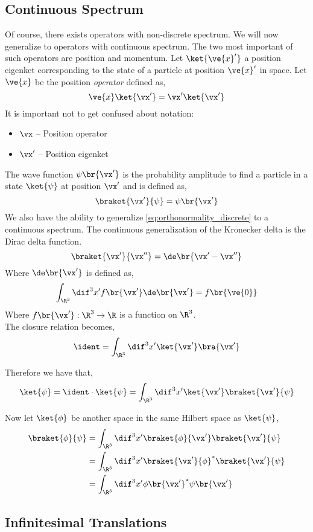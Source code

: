 \documentclass{article}
\begin{document}
\subsection{Continuous Spectrum}
Of course, there exists operators with non-discrete spectrum. We will now generalize to operators with continuous spectrum. The two most important of such operators are position and momentum. Let $\ket{\ve{x}'}$ a position eigenket corresponding to the state of a particle at position $\ve{x}'$ in space. Let $\ve{x}$ be the position \textit{operator} defined as,
\[ \ve{x} \ket{\vx'} = \vx' \ket{\vx'} \]
It is important not to get confused about notation:
\begin{itemize}
    \item $\vx$ -- Position operator
    \item $\vx'$ -- Position eigenket
\end{itemize}
The wave function $\psi\br{\vx'}$ is the probability amplitude to find a particle in a state $\ket{\psi}$ at position $\vx'$ and is defined as,
\[ \braket{\vx'}{\psi} = \psi\br{\vx'} \]
We also have the ability to generalize \cref{eq:orthonormality_discrete} to a continuous spectrum. The continuous generalization of the Kronecker delta is the Dirac delta function.
\[ \braket{\vx'}{\vx''} = \de\br{\vx' - \vx''} \]
Where $\de\br{\vx'}$ is defined as,
\[ \int_{\R^3} \dif^3 x' f\br{\vx'} \de\br{\vx'} = f\br{\ve{0}} \]
Where $f\br{\vx'} : \R^3 \to \R$ is a function on $\R^3$. \\

The closure relation becomes,
\[ \ident = \int_{\R^3} \dif^3 x' \ket{\vx'} \bra{\vx'} \]

Therefore we have that,
\[ \ket{\psi} = \ident \cdot \ket{\psi} = \int_{\R^3} \dif^3 x' \ket{\vx'} \braket{\vx'}{\psi} \]

Now let $\ket{\phi}$ be another space in the same Hilbert space as $\ket{\psi}$,
\begin{align*}
\braket{\phi}{\psi} &= \int_{\R^3} \dif^3 x' \braket{\phi}{\vx'} \braket{\vx'}{\psi} \\
&= \int_{\R^3} \dif^3 x' \braket{\vx'}{\phi}^{*} \braket{\vx'}{\psi} \\
&= \int_{\R^3} \dif^3 x' \phi\br{\vx'}^{*} \psi\br{\vx'}
\end{align*}

\subsection{Infinitesimal Translations}
\end{document}
